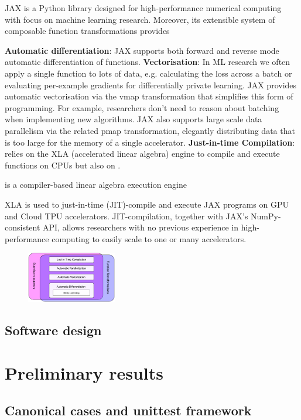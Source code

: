 \documentclass[11pt]{article}
\begin{document}
JAX is a Python library designed for high-performance numerical computing with focus on machine learning research. Moreover, its extensible system of composable function transformations provides 


\textbf{Automatic differentiation}: JAX supports both forward and reverse mode automatic differentiation of functions.
\textbf{Vectorisation}: In ML research we often apply a single function to lots of data, e.g. calculating the loss across a batch or evaluating per-example gradients for differentially private learning. JAX provides automatic vectorisation via the vmap transformation that simplifies this form of programming. For example, researchers don't need to reason about batching when implementing new algorithms. JAX also supports large scale data parallelism via the related pmap transformation, elegantly distributing data that is too large for the memory of a single accelerator.
\textbf{Just-in-time Compilation}: relies on the XLA (accelerated linear algebra) engine to compile and execute functions on CPUs but also on . 


is a compiler-based linear algebra execution engine


XLA is used to just-in-time (JIT)-compile and execute JAX programs on GPU and Cloud TPU accelerators. JIT-compilation, together with JAX's NumPy-consistent API, allows researchers with no previous experience in high-performance computing to easily scale to one or many accelerators.


\begin{figure}[htbp]
\centering
\includegraphics[width=0.35\textwidth]{./img/JAX-overview.png}
\caption{\label{fig:org04b5e20}}
\end{figure}


\subsection{Software design}
\label{sec:org99304fa}

\section{Preliminary results}
\label{sec:orgeb19789}
\subsection{Canonical cases and unittest framework}
\label{sec:org9f8fae1}
\end{document}
